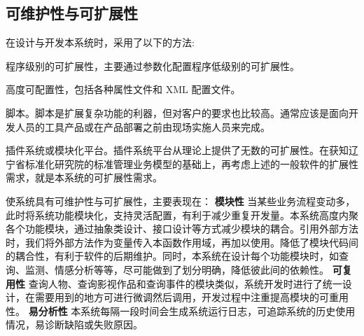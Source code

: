 \subsection{可维护性与可扩展性}
在设计与开发本系统时，采用了以下的方法:
\item 程序级别的可扩展性，主要通过参数化配置程序低级别的可扩展性。
\item 高度可配置性，包括各种属性文件和 XML 配置文件。
\item 脚本。脚本是扩展复杂功能的利器，但对客户的要求也比较高。通常应该是面向开发人员的工具产品或在产品部署之前由现场实施人员来完成。
\item 插件系统或模块化平台。插件系统平台从理论上提供了无数的可扩展性。在获知辽宁省标准化研究院的标准管理业务模型的基础上，再考虑上述的一般软件的扩展性需求，就是本系统的可扩展性需求。

使系统具有可维护性与可扩展性，主要表现在：
\textbf{模块性}
当某些业务流程变动多，此时将系统功能模块化，支持灵活配置，有利于减少重复开发量。本系统高度内聚各个功能模块，通过抽象类设计、接口设计等方式减少模块的耦合。引用外部方法时，我们将外部方法作为变量传入本函数作用域，再加以使用。降低了模块代码间的耦合性，有利于软件的后期维护。同时，本系统在设计每个功能模块时，如查询、监测、情感分析等等，尽可能做到了划分明确，降低彼此间的依赖性。
\textbf{可复用性}
查询人物、查询影视作品和查询事件的模块类似，系统开发时进行了统一设计，在需要用到的地方可进行微调然后调用，开发过程中注重提高模块的可重用性。
\textbf{易分析性}
本系统每隔一段时间会生成系统运行日志，可追踪系统的历史使用情况，易诊断缺陷或失败原因。



